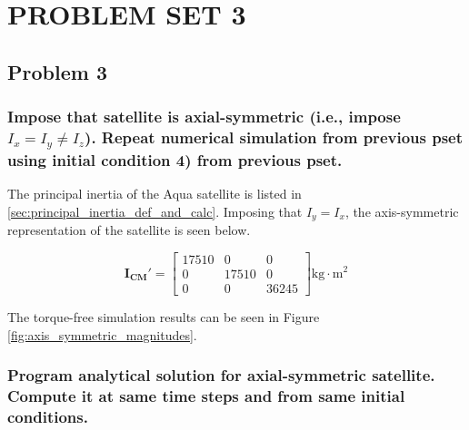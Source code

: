 \section{\Large PROBLEM SET 3}
\subsection{Problem 3}

\subsubsection{Impose that satellite is axial-symmetric (i.e., impose $I_x=I_y\neq I_z$). Repeat numerical simulation from previous pset using initial condition 4) from previous pset.}

The principal inertia of the Aqua satellite is listed in \ref{sec:principal_inertia_def_and_calc}. Imposing that $I_y=I_x$, the axis-symmetric representation of the satellite is seen below.

\begin{equation*}
    \boldsymbol{I_{CM}'} = \begin{bmatrix}
        17510 & 0 & 0 \\
        0 & 17510 & 0 \\
        0 & 0 & 36245
    \end{bmatrix} \text{kg} \cdot \text{m}^2
\end{equation*}

The torque-free simulation results can be seen in Figure \ref{fig:axis_symmetric_magnitudes}.

\subsubsection{Program analytical solution for axial-symmetric satellite. Compute it at same time steps and from same initial conditions.}

